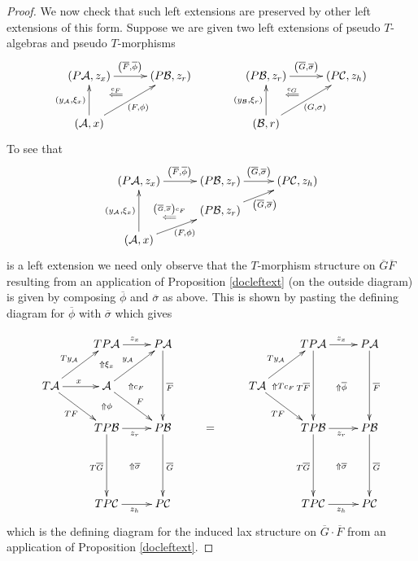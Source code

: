 \documentclass[a4paper,oneside,english]{amsart}
\numberwithin{equation}{section}
\numberwithin{figure}{section}
\theoremstyle{plain}
\theoremstyle{definition}
\theoremstyle{remark}
\theoremstyle{definition}
\theoremstyle{plain}
\theoremstyle{plain}
\theoremstyle{plain}
\begin{document}
\begin{proof}
We now check that such left extensions are preserved by other left
extensions of this form. Suppose we are given two left extensions
of pseudo $T$-algebras and pseudo $T$-morphisms
\[
\xymatrix@=1em{\left(P\mathcal{A},z_{x}\right)\ar[rr]^{\left(\overline{F},\overline{\phi}\right)}\ar@{}[dr]|-{\stackrel{c_{F}}{\Longleftarrow}} &  & \left(P\mathcal{B},z_{r}\right) &  &  & \left(P\mathcal{B},z_{r}\right)\ar[rr]^{\left(\overline{G},\overline{\sigma}\right)}\ar@{}[dr]|-{\stackrel{c_{G}}{\Longleftarrow}} &  & \left(P\mathcal{C},z_{h}\right)\\
 & \; &  &  &  &  & \;\\
\left(\mathcal{A},x\right)\ar[uurr]_{\left(F,\phi\right)}\ar[uu]^{\left(y_{\mathcal{A}},\xi_{x}\right)} &  &  &  &  & \left(\mathcal{B},r\right)\ar[uurr]_{\left(G,\sigma\right)}\ar[uu]^{\left(y_{\mathcal{B}},\xi_{r}\right)}
}
\]
To see that
\[
\xymatrix@=1em{\left(P\mathcal{A},z_{x}\right)\ar[rr]^{\left(\overline{F},\overline{\phi}\right)} &  & \left(P\mathcal{B},z_{r}\right)\ar[rr]^{\left(\overline{G},\overline{\sigma}\right)} &  & \left(P\mathcal{C},z_{h}\right)\\
\ar@{}[rr]|-{\stackrel{\left(\overline{G},\overline{\sigma}\right)c_{F}}{\Longleftarrow}} & \; & \left(P\mathcal{B},z_{r}\right)\ar[rur]_{\left(\overline{G},\overline{\sigma}\right)}\\
\left(\mathcal{A},x\right)\ar[urr]_{\left(F,\phi\right)}\ar[uu]^{\left(y_{\mathcal{A}},\xi_{x}\right)}
}
\]
is a left extension we need only observe that the $T$-morphism structure
on $\overline{G}\overline{F}$ resulting from an application of Proposition
\ref{docleftext} (on the outside diagram) is given by composing $\overline{\phi}$
and $\overline{\sigma}$ as above. This is shown by pasting the defining
diagram for $\overline{\phi}$ with $\overline{\sigma}$ which gives

\[
\xymatrix{ & TP\mathcal{A}\ar[r]^{z_{x}} & P\mathcal{A}\ar[dd]^{\overline{F}} &  &  & TP\mathcal{A}\ar[r]^{z_{x}}\ar[dd]_{T\overline{F}} & P\mathcal{A}\ar[dd]^{\overline{F}}\\
T\mathcal{A}\ar[r]^{x}\ar[ur]^{Ty_{\mathcal{A}}}\ar[rd]_{TF} & \mathcal{A}\ar[dr]^{F}\ar[ur]^{y_{\mathcal{A}}}\ar@{}[r]|-{\Uparrow c_{F}}\ar@{}[u]|-{\Uparrow\xi_{x}} & \; &  & T\mathcal{A}\ar[ru]^{Ty_{\mathcal{A}}}\ar[rd]_{TF}\ar@{}[r]|-{\Uparrow Tc_{F}\quad} & \;\ar@{}[r]|-{\Uparrow\overline{\phi}} & \;\\
 & TP\mathcal{B}\ar[r]_{z_{r}}\ar@{}[u]|-{\Uparrow\phi}\ar[dd]_{T\overline{G}} & P\mathcal{B}\ar[dd]^{\overline{G}} & = &  & TP\mathcal{B}\ar[r]_{z_{r}}\ar[dd]_{T\overline{G}} & P\mathcal{B}\ar[dd]^{\overline{G}}\\
 & \;\ar@{}[r]|-{\Uparrow\overline{\sigma}} & \; &  &  & \;\ar@{}[r]|-{\Uparrow\overline{\sigma}} & \;\\
 & TP\mathcal{C}\ar[r]_{z_{h}} & P\mathcal{C} &  &  & TP\mathcal{C}\ar[r]_{z_{h}} & P\mathcal{C}
}
\]
which is  the defining diagram for the induced lax structure on $\overline{G}\cdot\overline{F}$
from an application of Proposition \ref{docleftext}.


\end{proof}
\end{document}
